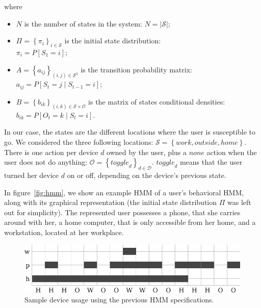where 
\begin{itemize}
	\item $N$ is the number of states in the system:
	$N = \left| \mathcal{S} \right|$;

	\item $\Pi=\left\{ \pi_i\right\}_{i\in\mathcal{S}}$ is the initial state distribution:\\
	$\pi_i=P[S_1=i]$;

	\item $A = \left\{ a_{ij}\right\}_{(i,j)\in\mathcal{S}^2}$ is the transition probability matrix:\\
	$a_{ij}=P[S_t=j \mid S_{t-1}=i]$;

	\item $B = \left\{ b_{ik}\right\}_{(i,k)\in\mathcal{S}\times\mathcal{O}}$ is the matrix of states conditional densities:
	$b_{ik} = P[O_t=k \mid S_t = i]$.
\end{itemize}

In our case, the states are the different locations where the user is susceptible to go.
We considered the three following locations: $\mathcal{S}=\left\{ \mathit{work}, \mathit{outside}, \mathit{home} \right\}$. 
There is one action per device $d$ owned by the user, plus a $\mathit{none}$ action when the user does not do anything: 
$\mathcal{O} = \left\{ \mathit{toggle}_d \right\}_{d\in \mathcal{D}}$.
$\mathit{toggle}_d$ means that the user turned her device $d$ on or off, depending on the device's previous state.

In figure~\ref{fig:hmm}, we show an example HMM of a user's behavioral HMM, along with its graphical representation (the initial state distribution $\Pi$ was left out for simplicity). 
The represented user possesses a phone, that she carries around with her, a home computer, that is only accessible from her home, and a workstation, located at her workplace.

\begin{figure}[t]
\centering
\includegraphics[width=\columnwidth]{figures/sample_usage.pdf}

\caption{\label{fig:sample_usage}Sample device usage using the previous HMM specifications. 
}
\end{figure}

